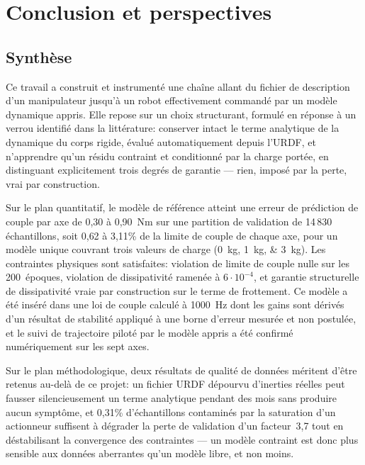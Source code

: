 \documentclass[a4paper, oneside]{article}
\begin{document}
\section{Conclusion et perspectives}
\label{sec:conclusion}

\subsection{Synthèse}

Ce travail a construit et instrumenté une chaîne allant du fichier de
description d'un manipulateur jusqu'à un robot effectivement commandé par un
modèle dynamique appris. Elle repose sur un choix structurant, formulé en
réponse à un verrou identifié dans la littérature: conserver intact le terme
analytique de la dynamique du corps rigide, évalué automatiquement depuis
l'URDF, et n'apprendre qu'un résidu contraint et conditionné par la charge
portée, en distinguant explicitement trois degrés de garantie — rien, imposé par
la perte, vrai par construction.

Sur le plan quantitatif, le modèle de référence atteint une erreur de prédiction
de couple par axe de 0{,}30 à 0{,}90~Nm sur une partition de validation de
14\,830 échantillons, soit 0{,}62 à 3{,}11\% de la limite de couple de chaque
axe, pour un modèle unique couvrant trois valeurs de charge (\SIlist{0;1;3}{kg}). Les
contraintes physiques sont satisfaites: violation de limite de couple nulle sur
les 200~époques, violation de dissipativité ramenée à $6\cdot 10^{-4}$, et
garantie structurelle de dissipativité vraie par construction sur le terme de
frottement. Ce modèle a été inséré dans une loi de couple calculé à \SI{1000}{Hz} dont
les gains sont dérivés d'un résultat de stabilité appliqué à une borne d'erreur
mesurée et non postulée, et le suivi de trajectoire piloté par le modèle appris
a été confirmé numériquement sur les sept axes.

Sur le plan méthodologique, deux résultats de qualité de données méritent d'être
retenus au-delà de ce projet: un fichier URDF dépourvu d'inerties réelles peut
fausser silencieusement un terme analytique pendant des mois sans produire aucun
symptôme, et 0{,}31\% d'échantillons contaminés par la saturation d'un
actionneur suffisent à dégrader la perte de validation d'un facteur~3{,}7 tout
en déstabilisant la convergence des contraintes — un modèle contraint est donc
plus sensible aux données aberrantes qu'un modèle libre, et non moins.
\end{document}
